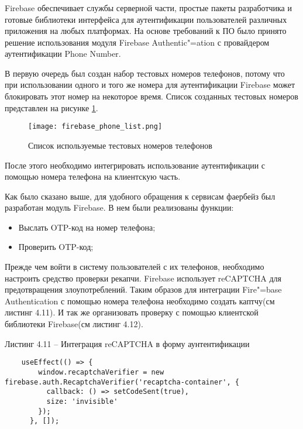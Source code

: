\subsubsection{}

Firebase обеспечивает службы серверной части, простые пакеты разработчика и готовые библиотеки интерфейса для аутентификации пользователей различных приложения на любых платформах.
На основе требований к ПО было принято решение использования модуля Firebase Authentic"=ation с провайдером аутентификации Phone Number.

В первую очередь был создан набор тестовых номеров телефонов, потому что при использовании одного и того же номера для аутентификации Firebase может блокировать этот номер на некоторое время.
Список созданных тестовых номеров представлен на рисунке \ref{fire:phones}.
\begin{figure}[ht]
    \centering
    \texttt{[image: firebase\_phone\_list.png]}
    \caption{ Список используемые тестовых номеров телефонов }
    \label{fire:phones}
\end{figure}

После этого необходимо интегрировать использование аутентификации с помощью номера телефона на клиентскую часть.

Как было сказано выше, для удобного обращения к сервисам фаербейз был разработан модуль Firebase.
В нем были реализованы функции:
\begin{itemize}
    \item Выслать OTP-код на номер телефона;
    \item Проверить OTP-код;
\end{itemize}

Прежде чем войти в систему пользователей с их телефонов, необходимо настроить средство проверки рекапчи.
Firebase использует reCAPTCHA для предотвращения злоупотреблений.
Таким образов для интеграции Fire"=base Authentication с помощью номера телефона необходимо создать каптчу(см листинг 4.11).
И так же организовать проверку с помощью клиентской библиотеки Firebase(см листинг 4.12).

\pagebreak

Листинг 4.11 – Интеграция reCAPTCHA в форму аунтентификации
\begin{lstlisting}
    useEffect(() => {
        window.recaptchaVerifier = new firebase.auth.RecaptchaVerifier('recaptcha-container', {
          callback: () => setCodeSent(true),
          size: 'invisible'
        });
      }, []);
\end{lstlisting}

